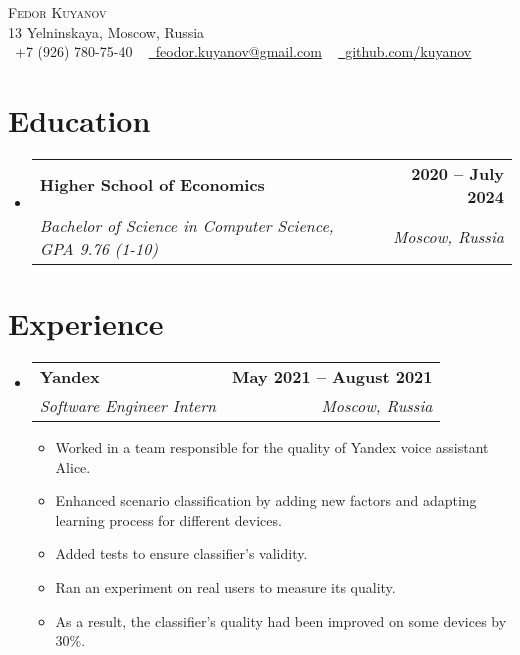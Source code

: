 \documentclass[letterpaper,11pt]{article}
\makeatletter
\newcommand{\resumeItem}[1]{
    \item\small{
        {#1 \vspace{-2pt}}
    }
}
\newcommand{\resumeSubheading}[4]{
    \vspace{-2pt}\item
    \begin{tabular*}{1.0\textwidth}[t]{l@{\extracolsep{\fill}}r}
        \textbf{#1} & \textbf{\small #2} \\
        \textit{\small#3} & \textit{\small #4} \\
    \end{tabular*}\vspace{-7pt}
}
\newcommand{\resumeSubHeadingListStart}{\begin{itemize}[leftmargin=0.0in, label={}]}
\newcommand{\resumeSubHeadingListEnd}{\end{itemize}}
\newcommand{\resumeItemListStart}{\begin{itemize}}
\newcommand{\resumeItemListEnd}{\end{itemize}\vspace{-5pt}}
\makeatother
\begin{document}
\begin{center}
    {\Huge \scshape Fedor Kuyanov} \\ \vspace{5pt}
    13 Yelninskaya, Moscow, Russia \\ \vspace{5pt}
    \small \raisebox{-0.1\height}\faPhone\ +7 (926) 780-75-40 ~ \href{mailto:x@gmail.com}{\raisebox{-0.2\height}\faEnvelope\  \underline{feodor.kuyanov@gmail.com}} ~ 
    \href{https://github.com/}{\raisebox{-0.2\height}\faGithub\ \underline{github.com/kuyanov}}
    \vspace{-8pt}
\end{center}


\section{Education}
    \resumeSubHeadingListStart
    \resumeSubheading
        {Higher School of Economics}{2020 -- July 2024}
        {Bachelor of Science in Computer Science, GPA 9.76 (1-10)}{Moscow, Russia}
    \resumeSubHeadingListEnd


\section{Experience}
    \resumeSubHeadingListStart
    \resumeSubheading
        {Yandex}{May 2021 -- August 2021}
        {Software Engineer Intern}{Moscow, Russia}
    \resumeItemListStart
        \resumeItem{Worked in a team responsible for the quality of Yandex voice assistant Alice.}
        \resumeItem{Enhanced scenario classification by adding new factors and adapting learning process for different devices.}
        \resumeItem{Added tests to ensure classifier's validity.}
        \resumeItem{Ran an experiment on real users to measure its quality.}
        \resumeItem{As a result, the classifier's quality had been improved on some devices by 30\%.}
    \resumeItemListEnd
    \resumeSubHeadingListEnd
\vspace{-16pt}


\end{document}
